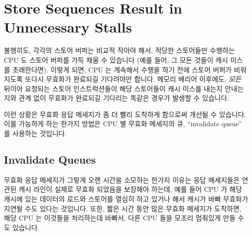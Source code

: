 \section{Store Sequences Result in Unnecessary Stalls}
\label{sec:app:whymb:Store Sequences Result in Unnecessary Stalls}

불행히도, 각각의 스토어 버퍼는 비교적 작아야 해서, 적당한 스토어들만 수행하는
CPU 도 스토어 버퍼를 가득 채울 수 있습니다 (예를 들어, 그 모든 것들이 캐시
미스를 초래한다면).
이렇게 되면, CPU 는 계속해서 수행을 하기 전에 스토어 버퍼가 비워지도록 또다시
무효화가 완료되길 기다려야만 합니다.
메모리 배리어 이후에도, \emph{모든} 뒤이어 요청되는 스토어 인스트럭션들이 해당
스토어들이 캐시 미스를 내는지 안내는지와 관계 없이 무효화가 완료되길 기다리는
똑같은 경우가 발생할 수 있습니다.

이런 상황은 무효화 응답 메세지가 좀 더 빨리 도착하게 함으로써 개선될 수
있습니다.
이를 가능하게 하는 한가지 방법은 CPU 별 무효화 메세지의 큐, ``invalidate
queue'' 를 사용하는 것입니다.
\iffalse

Unfortunately, each store buffer must be relatively small, which means
that a CPU executing a modest sequence of stores can fill its store
buffer (for example, if all of them result in cache misses).
At that point, the CPU must once again wait for invalidations to complete
in order to drain its store buffer before it can continue executing.
This same situation can arise immediately after a memory barrier, when
\emph{all} subsequent store instructions must wait for invalidations to
complete, regardless of whether or not these stores result in cache misses.

This situation can be improved by making invalidate acknowledge
messages arrive more quickly.
One way of accomplishing this is to use per-CPU queues of
invalidate messages, or ``invalidate queues''.
\fi

\subsection{Invalidate Queues}
\label{sec:app:whymb:Invalidate Queues}

무효화 응답 메세지가 그렇게 오랜 시간을 소모하는 한가지 이유는 응답 메세지들은
연관된 캐시 라인이 실제로 무효화 되었음을 보장해야 하는데, 예를 들어 CPU 가
해당 캐시에 있는 데이터의 로드와 스토어를 열심히 하고 있거나 해서 캐시가 바빠
무효화가 지연될 수도 있다는 것입니다.
또한, 짧은 시간 동안 많은 무효화 메세지가 도착하면, 해당 CPU 는 이것들을
처리하는데 바빠서, 다른 CPU 들을 모조리 멈춰있게 만들 수도 있습니다.

